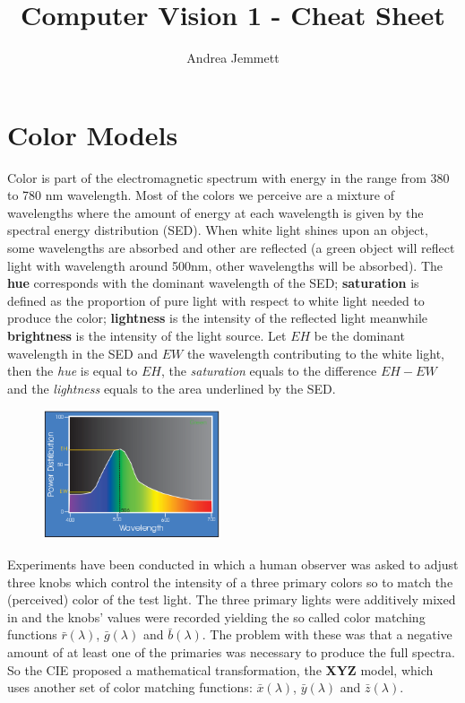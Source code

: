 \documentclass[a4paper,twocolumn]{article}
\title{Computer Vision 1 - Cheat Sheet}
\author{Andrea Jemmett}
\begin{document}
\maketitle

\section{Color Models}
Color is part of the electromagnetic spectrum with energy in the range from 380
to 780 nm wavelength. Most of the colors we perceive are a mixture of
wavelengths where the amount of energy at each wavelength is given by the
spectral energy distribution (SED). When white light shines upon an object, some
wavelengths are absorbed and other are reflected (a green object will reflect
light with wavelength around 500nm, other wavelengths will be absorbed). The
\textbf{hue} corresponds with the dominant wavelength of the SED;
\textbf{saturation} is defined as the proportion of pure light with respect to
white light needed to produce the color; \textbf{lightness} is the intensity of
the reflected light meanwhile \textbf{brightness} is the intensity of the light
source. Let $EH$ be the dominant wavelength in the SED and $EW$ the wavelength
contributing to the white light, then the \textit{hue} is equal to $EH$, the
\textit{saturation} equals to the difference $EH - EW$ and the
\textit{lightness} equals to the area underlined by the SED.

\begin{figure}[htpb]
	\centering
	\includegraphics[height=1.5in]{imgs/color-sed.png}
\end{figure}

Experiments have been conducted in which a human observer was asked to adjust
three knobs which control the intensity of a three primary colors so to match
the (perceived) color of the test light. The three primary lights were
additively mixed in and the knobs' values were recorded yielding the so called
color matching functions $\bar{r}(\lambda)$, $\bar{g}(\lambda)$ and
$\bar{b}(\lambda)$. The problem with these was that a negative amount of
at least one of the primaries was necessary to produce the full spectra. So the
CIE proposed a mathematical transformation, the \textbf{XYZ} model, which uses
another set of color matching functions: $\bar{x}(\lambda)$, $\bar{y}(\lambda)$
and $\bar{z}(\lambda)$.
\end{document}

